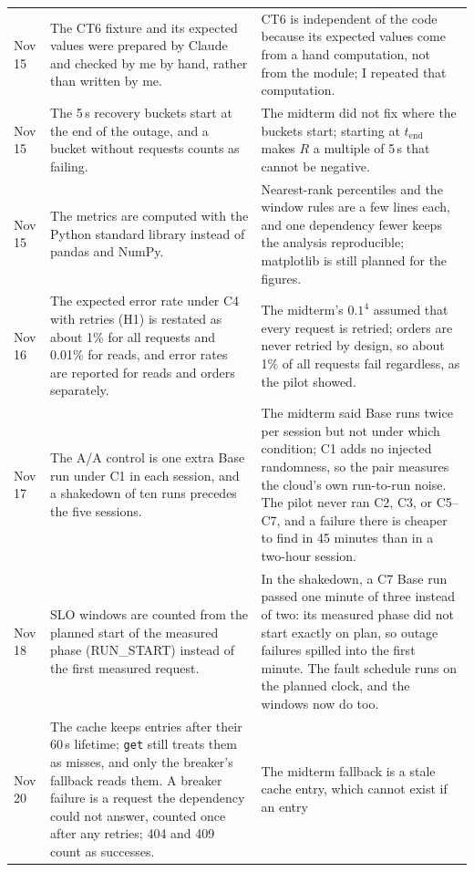 \documentclass[10pt]{article}
\begin{document}
\begin{table}[htbp]
\begin{tabularx}{\linewidth}{@{}l>{\RaggedRight}X>{\RaggedRight\arraybackslash}X@{}}
Nov 15 & The CT6 fixture and its expected values were prepared by Claude and
  checked by me by hand, rather than written by me. &
  CT6 is independent of the code because its expected values come from a hand
  computation, not from the module; I repeated that computation. \\
Nov 15 & The 5\,s recovery buckets start at the end of the outage, and a
  bucket without requests counts as failing. &
  The midterm did not fix where the buckets start; starting at $t_\mathrm{end}$
  makes $R$ a multiple of 5\,s that cannot be negative. \\
Nov 15 & The metrics are computed with the Python standard library instead of
  pandas and NumPy. &
  Nearest-rank percentiles and the window rules are a few lines each, and one
  dependency fewer keeps the analysis reproducible; matplotlib is still planned
  for the figures. \\
Nov 16 & The expected error rate under C4 with retries (H1) is restated as
  about 1\% for all requests and 0.01\% for reads, and error rates are reported
  for reads and orders separately. &
  The midterm's $0.1^4$ assumed that every request is retried; orders are never
  retried by design, so about 1\% of all requests fail regardless, as the pilot
  showed. \\
Nov 17 & The A/A control is one extra Base run under C1 in each session, and a
  shakedown of ten runs precedes the five sessions. &
  The midterm said Base runs twice per session but not under which condition;
  C1 adds no injected randomness, so the pair measures the cloud's own
  run-to-run noise. The pilot never ran C2, C3, or C5--C7, and a failure there
  is cheaper to find in 45 minutes than in a two-hour session. \\
Nov 18 & SLO windows are counted from the planned start of the measured phase
  (RUN\_START) instead of the first measured request. &
  In the shakedown, a C7 Base run passed one minute of three instead of two:
  its measured phase did not start exactly on plan, so outage failures spilled
  into the first minute. The fault schedule runs on the planned clock, and the
  windows now do too. \\
Nov 20 & The cache keeps entries after their 60\,s lifetime; \texttt{get}
  still treats them as misses, and only the breaker's fallback reads them. A
  breaker failure is a request the dependency could not answer, counted once
  after any retries; 404 and 409 count as successes. &
  The midterm fallback is a stale cache entry, which cannot exist if an entry

\end{tabularx}
\end{table}
\end{document}

